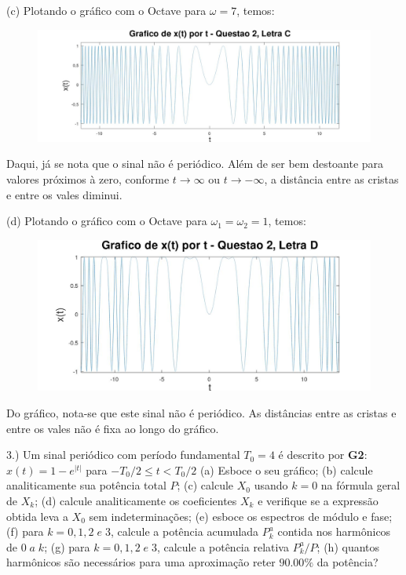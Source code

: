 \documentclass{article}
\begin{document}
(c) Plotando o gráfico com o Octave para $\omega = 7$, temos:
\begin{figure}[h!]
    \includegraphics[scale=0.3]{plot2c}
    \centering
\end{figure}

Daqui, já se nota que o sinal não é periódico. Além de ser bem destoante para valores próximos à zero, conforme $t \rightarrow \infty$ ou $t \rightarrow - \infty$, a distância entre as cristas e entre os vales diminui.

\vspace{\baselineskip}

(d) Plotando o gráfico com o Octave para $\omega_{1} = \omega_{2} = 1$, temos:
\begin{figure}[h!]
    \includegraphics[scale=0.3]{plot2d}
    \centering
\end{figure}

\vspace{\baselineskip}

Do gráfico, nota-se que este sinal não é periódico. As distâncias entre as cristas e entre os vales não é fixa ao longo do gráfico.

\vspace{\baselineskip}

3.) Um sinal periódico com período fundamental $T_{0} = 4 $ é descrito por \textbf{G2}: $x(t) = 1 - e^{|t|}$ para $-T_{0}/2 \leq t < T_{0} / 2$
(a) Esboce o seu gráfico;
(b) calcule analiticamente sua potência total $P$;
(c) calcule $X_{0}$ usando $k = 0$ na fórmula geral de $X_{k}$;
(d) calcule analiticamente os coeficientes $X_{k}$ e verifique se a expressão obtida leva a $X_{0}$ sem indeterminações;
(e) esboce os espectros de módulo e fase;
(f) para $k = 0, 1, 2\;e\;3$, calcule a potência acumulada $P_{k}^{a}$ contida nos harmônicos de $0\;a\;k$;
(g) para $k = 0, 1, 2\;e\;3$, calcule a potência relativa $P_{k}^{a}/P$;
(h) quantos harmônicos são necessários para uma aproximação reter $90.00\%$ da potência?
\end{document}
